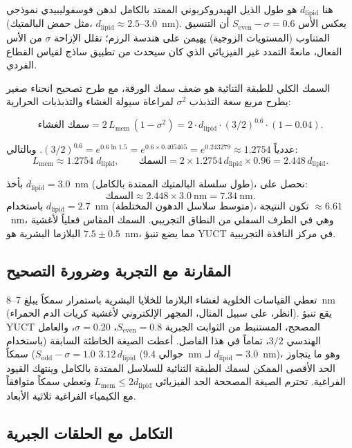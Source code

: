 \documentclass[12pt,a4paper]{article}
\begin{document}
	هنا \(d_{\mathrm{lipid}}\) هو طول الذيل الهيدروكربوني الممتد بالكامل لدهن فوسفوليبيدي نموذجي (مثل حمض البالمتيك، \(d_{\mathrm{lipid}} \approx 2.5\)–\(3.0\)~nm). يعكس الأس \(S_{\mathrm{even}} - \sigma = 0.6\) أن التنسيق المتناوب (المستويات الزوجية) يهيمن على هندسة الرزم؛ تقلل الإزاحة \(\sigma\) من الأس الفعال، مانعةً التمدد غير الفيزيائي الذي كان سيحدث من تطبيق ساذج لقياس القطاع الفردي.
	
	السمك الكلي للطبقة الثنائية هو ضعف سمك الورقة، مع طرح تصحيح انحناء صغير يطرح مربع سعة التذبذب \(\sigma^2\) لمراعاة سيولة الغشاء والتذبذبات الحرارية:
	
	\[
	\text{سمك الغشاء} = 2 \, L_{\mathrm{mem}} \, (1 - \sigma^2)
	= 2 \cdot d_{\mathrm{lipid}} \cdot (3/2)^{0.6} \cdot (1 - 0.04).
	\]
	
	عددياً \((3/2)^{0.6} = e^{0.6 \ln 1.5} = e^{0.6 \times 0.405465} = e^{0.243279} \approx 1.2754\). وبالتالي:
	\[
	L_{\mathrm{mem}} \approx 1.2754 \; d_{\mathrm{lipid}}, \qquad
	\text{السمك} = 2 \times 1.2754 \, d_{\mathrm{lipid}} \times 0.96 = 2.448 \, d_{\mathrm{lipid}}.
	\]
	
	بأخذ \(d_{\mathrm{lipid}} = 3.0\)~nm (طول سلسلة البالمتيك الممتدة بالكامل)، نحصل على:
	\[
	\text{السمك} \approx 2.448 \times 3.0\ \text{nm} = 7.34\ \text{nm}.
	\]
	باستخدام \(d_{\mathrm{lipid}} = 2.7\)~nm (متوسط سلاسل الدهون المختلطة)، تكون النتيجة \(\approx 6.61\)~nm، وهي في الطرف السفلي من النطاق التجريبي. السمك المقاس فعلياً لأغشية البلازما البشرية هو \(7.5 \pm 0.5\)~nm، مما يضع تنبؤ YUCT في مركز النافذة التجريبية.
	
	\subsection*{المقارنة مع التجربة وضرورة التصحيح}
	
	تعطي القياسات الخلوية لغشاء البلازما للخلايا البشرية باستمرار سمكاً يبلغ 7–8~nm (انظر، على سبيل المثال، المجهر الإلكتروني لأغشية كريات الدم الحمراء). يقع تنبؤ YUCT المصحح، المستنبط من الثوابت الجبرية \(S_{\mathrm{even}} = 0.8\)، \(\sigma = 0.20\)، والعامل الهندسي \(3/2\)، تماماً في هذا الفاصل. أعطت الصيغة الخاطئة السابقة (باستخدام \(S_{\mathrm{odd}}-\sigma = 1.0\)) سمكاً \(3.12 \, d_{\mathrm{lipid}}\) (حوالي 9.4~nm لـ \(d_{\mathrm{lipid}}=3.0\)~nm)، وهو ما يتجاوز الحد الأقصى الممكن لسمك الطبقة الثنائية للسلاسل الممتدة بالكامل وينتهك القيود الفراغية. تحترم الصيغة المصححة الحد الفيزيائي \(L_{\mathrm{mem}} \le 2 d_{\mathrm{lipid}}\) وتعطي سمكاً متوافقاً مع الكيمياء الفراغية ثلاثية الأبعاد.
	
	\subsection*{التكامل مع الحلقات الجبرية}
	
\end{document}
